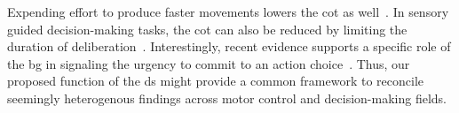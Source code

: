 \par
Expending effort to produce faster movements lowers the \gls{cot} as well~\cite{Shadmehr2019TINS}.
In sensory guided decision-making tasks, the \gls{cot} can also be reduced by limiting the duration of deliberation~\cite{Carland2019NeuroSci}.
Interestingly, recent evidence supports a specific role of the \gls{bg} in signaling the urgency to commit to an action choice~\cite{Thura2017Neruon,Carland2019NeuroSci}.
Thus, our proposed function of the \gls{ds} might provide a common framework to reconcile seemingly heterogenous findings across motor control and decision-making fields.
